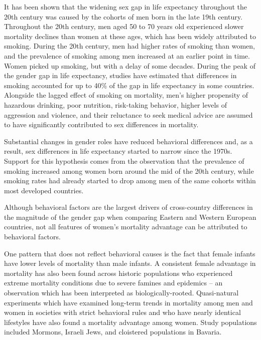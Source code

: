 It has been shown that the widening sex gap in life expectancy throughout 
the 20th century was caused by the cohorts of men born in the late 19th 
century.\citep{beltran2015} Throughout the 20th century, men aged 50 to 70 
years old experienced slower mortality declines than women at these ages, 
which has been widely attributed to smoking.\citep{glei2007narrowing} 
During the 20th century, men had higher rates of smoking than women, and 
the prevalence of smoking among men increased at an earlier point in time.\citep{beltran2015}
Women picked up smoking, but with a delay of some decades.\citep{thun2012stages} 
During the peak of the gender gap in life expectancy, studies have estimated 
that differences in smoking accounted for up to 40\% of the gap in life 
expectancy in some countries.\citep{valkonen1997contribution} Alongside 
the lagged effect of smoking on mortality, men's higher propensity of 
hazardous drinking, poor nutrition, risk-taking behavior, higher levels 
of aggression and violence, and their reluctance to seek medical advice 
are assumed to have significantly contributed to sex differences in 
mortality.\citep{case2005sex,oksuzyan2008}

Substantial changes in gender roles have reduced behavioral differences 
and, as a result, sex differences in life expectancy started to narrow 
since the 1970s.\citep{valkonen1997contribution} Support for this hypothesis 
comes from the observation that the prevalence of smoking increased 
among women born around the mid of the 20th century, while smoking rates had 
already started to drop among men of the same cohorts within most developed 
countries.\citep{lopez1994descriptive}

Although behavioral factors are the largest drivers of cross-country 
differences in the magnitude of the gender gap when comparing Eastern 
and Western European countries, not all features of women's mortality 
advantage can be attributed to behavioral factors.\citep{luy2014impact}

One pattern that does not reflect behavioral causes is the fact that female infants 
have lower levels of mortality than male infants.\citep{drevenstedt2008rise} 
A consistent female advantage in mortality has also been found across historic 
populations who experienced extreme mortality conditions due to severe famines 
and epidemics -- an observation which has been interpreted as biologically-rooted.\citep{zarulli2018women} 
Quasi-natural experiments which have examined long-term trends in mortality among 
men and women in societies with strict behavioral rules and who have nearly 
identical lifestyles have also found a mortality advantage among women. Study 
populations included Mormons,\citep{lindahl2013male} Israeli Jews,\citep{staetsky2009unusually} 
and cloistered populations in Bavaria.\citep{luy2003causes,luy2009unnatural}

